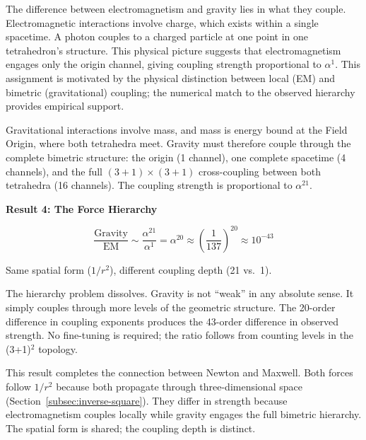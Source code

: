 \documentclass[aps,prd,preprint,superscriptaddress,showpacs,preprintnumbers,amsmath,amssymb,nofootinbib]{revtex4-2}
\begin{document}
The difference between electromagnetism and gravity lies in what they couple. Electromagnetic interactions involve charge, which exists within a single spacetime. A photon couples to a charged particle at one point in one tetrahedron's structure. This physical picture suggests that electromagnetism engages only the origin channel, giving coupling strength proportional to $\alpha^1$. This assignment is motivated by the physical distinction between local (EM) and bimetric (gravitational) coupling; the numerical match to the observed hierarchy provides empirical support.

Gravitational interactions involve mass, and mass is energy bound at the Field Origin, where both tetrahedra meet. Gravity must therefore couple through the complete bimetric structure: the origin (1 channel), one complete spacetime (4 channels), and the full $(3+1) \times (3+1)$ cross-coupling between both tetrahedra (16 channels). The coupling strength is proportional to $\alpha^{21}$.

\vspace{1.5em}
\noindent
\colorbox{resultgreen}{\parbox{\dimexpr\textwidth-2\fboxsep\relax}{%
\vspace{0.8em}
\centering
\textbf{\large Result 4: The Force Hierarchy}

\vspace{0.5em}
\boldmath
\begin{equation}
\frac{\text{Gravity}}{\text{EM}} \sim \frac{\alpha^{21}}{\alpha^1} = \alpha^{20} \approx \left(\frac{1}{137}\right)^{20} \approx 10^{-43}
\end{equation}
\unboldmath

\vspace{0.3em}
Same spatial form ($1/r^2$), different coupling depth (21 vs.\ 1).
\vspace{0.5em}
}}
\vspace{1cm}

The hierarchy problem dissolves. Gravity is not ``weak'' in any absolute sense. It simply couples through more levels of the geometric structure. The 20-order difference in coupling exponents produces the 43-order difference in observed strength. No fine-tuning is required; the ratio follows from counting levels in the (3+1)$^2$ topology.

This result completes the connection between Newton and Maxwell. Both forces follow $1/r^2$ because both propagate through three-dimensional space (Section~\ref{subsec:inverse-square}). They differ in strength because electromagnetism couples locally while gravity engages the full bimetric hierarchy. The spatial form is shared; the coupling depth is distinct.
\end{document}
